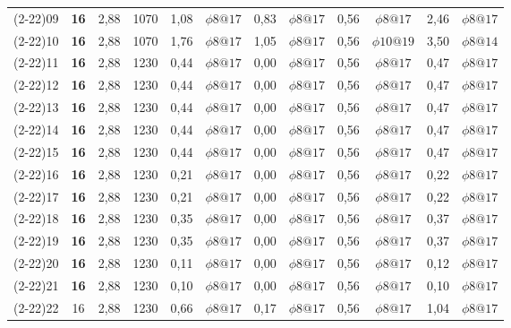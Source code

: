 \begin{table}[H]
{\begin{tabular}{|c|c|c|c|c|c|c|c|c|c|c|c|}
        (2-22)09 & \textbf{16} & 2,88  & 1070  & 1,08  & $\phi8@17$ & 0,83  & $\phi8@17$ & 0,56  & $\phi8@17$ & 2,46  & $\phi8@17$ \\
        (2-22)10 & \textbf{16} & 2,88  & 1070  & 1,76  & $\phi8@17$ & 1,05  & $\phi8@17$ & 0,56  & $\phi10@19$ & 3,50  & $\phi8@14$ \\
        (2-22)11 & \textbf{16} & 2,88  & 1230  & 0,44  & $\phi8@17$ & 0,00  & $\phi8@17$ & 0,56  & $\phi8@17$ & 0,47  & $\phi8@17$ \\
        (2-22)12 & \textbf{16} & 2,88  & 1230  & 0,44  & $\phi8@17$ & 0,00  & $\phi8@17$ & 0,56  & $\phi8@17$ & 0,47  & $\phi8@17$ \\
        (2-22)13 & \textbf{16} & 2,88  & 1230  & 0,44  & $\phi8@17$ & 0,00  & $\phi8@17$ & 0,56  & $\phi8@17$ & 0,47  & $\phi8@17$ \\
        (2-22)14 & \textbf{16} & 2,88  & 1230  & 0,44  & $\phi8@17$ & 0,00  & $\phi8@17$ & 0,56  & $\phi8@17$ & 0,47  & $\phi8@17$ \\
        (2-22)15 & \textbf{16} & 2,88  & 1230  & 0,44  & $\phi8@17$ & 0,00  & $\phi8@17$ & 0,56  & $\phi8@17$ & 0,47  & $\phi8@17$ \\
        (2-22)16 & \textbf{16} & 2,88  & 1230  & 0,21  & $\phi8@17$ & 0,00  & $\phi8@17$ & 0,56  & $\phi8@17$ & 0,22  & $\phi8@17$ \\
        (2-22)17 & \textbf{16} & 2,88  & 1230  & 0,21  & $\phi8@17$ & 0,00  & $\phi8@17$ & 0,56  & $\phi8@17$ & 0,22  & $\phi8@17$ \\
        (2-22)18 & \textbf{16} & 2,88  & 1230  & 0,35  & $\phi8@17$ & 0,00  & $\phi8@17$ & 0,56  & $\phi8@17$ & 0,37  & $\phi8@17$ \\
        (2-22)19 & \textbf{16} & 2,88  & 1230  & 0,35  & $\phi8@17$ & 0,00  & $\phi8@17$ & 0,56  & $\phi8@17$ & 0,37  & $\phi8@17$ \\
        (2-22)20 & \textbf{16} & 2,88  & 1230  & 0,11  & $\phi8@17$ & 0,00  & $\phi8@17$ & 0,56  & $\phi8@17$ & 0,12  & $\phi8@17$ \\
        (2-22)21 & \textbf{16} & 2,88  & 1230  & 0,10  & $\phi8@17$ & 0,00  & $\phi8@17$ & 0,56  & $\phi8@17$ & 0,10  & $\phi8@17$ \\
        (2-22)22 & 16    & 2,88  & 1230  & 0,66  & $\phi8@17$ & 0,17  & $\phi8@17$ & 0,56  & $\phi8@17$ & 1,04  & $\phi8@17$ \bigstrut[b]\\
        \hline
        \end{tabular}%
        }
      \label{resumenlosas2a22}%
    \end{table}%
    
